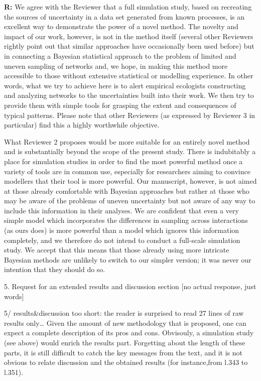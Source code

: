 \documentclass[12pt]{letter}
\newenvironment{refquote}{\bigskip \begin{it}}{\end{it}\smallskip}
\begin{document}
		\textbf{R:} We agree with the Reviewer that a full simulation study, based on recreating the sources of uncertainty in a data set generated from known processes, is an excellent way to demonstrate the power of a novel method. The novelty and impact of our work, however, is not in the method itself (several other Reviewers rightly point out that similar approaches have occasionally been used before) but in connecting a Bayesian statistical approach to the problem of limited and uneven sampling of networks and, we hope, in making this method more accessible to those without extensive statistical or modelling experience. In other words, what we try to achieve here is to alert empirical ecologists constructing and analyzing networks to the uncertainties built into their work. We then try to provide them with simple tools for grasping the extent and consequences of typical patterns. Please note that other Reviewers (as expressed by Reviewer 3 in particular) find this a highly worthwhile objective. 


		What Reviewer 2 proposes would be more suitable for an entirely novel method and is substantially beyond the scope of the present study. There is indubitably a place for simulation studies in order to find the most powerful method once a variety of tools are in common use, especially for researchers aiming to convince modellers that their tool is more powerful. Our manuscript, however, is not aimed at those already comfortable with Bayesian approaches but rather at those who may be aware of the problems of uneven uncertainty but not aware of any way to include this information in their analyses. We are confident that even a very simple model which incorporates the differences in sampling across interactions (as ours does) is more powerful than a model which ignores this information completely, and we therefore do not intend to conduct a full-scale simulation study. We accept that this means that those already using more intricate Bayesian methods are unlikely to switch to our simpler version; it was never our intention that they should do so.


	5. Request for an extended results and discussion section [no actual response, just words]


		\begin{refquote}
			5/ results\&discussion too short: the reader is surprised to read 27 lines of raw results only… Given the amount of new methodology that is proposed, one can expect a complete description of its pros and cons. Obvisouly, a simulation study (see above) would enrich the results part. Forgetting about the length of these parts, it is still difficult to catch the key messages from the text, and it is not obvious to relate discussion and the obtained results (for instance,from l.343 to l.351).
		\end{refquote}
\end{document}
